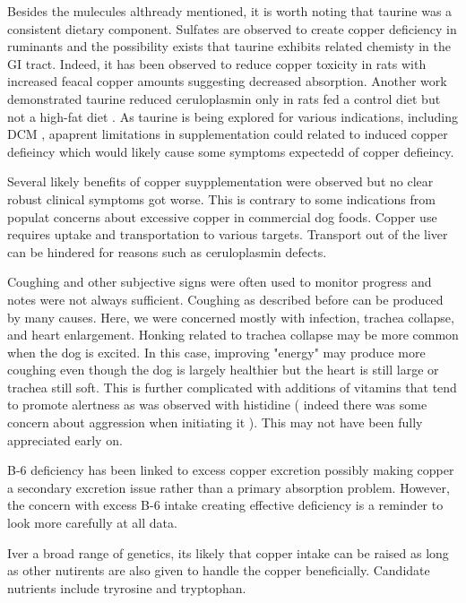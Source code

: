 Besides the mulecules althready mentioned, it is worth
noting that taurine was a consistent dietary component.
Sulfates are observed to create copper deficiency in ruminants
and the possibility exists that taurine exhibits related chemisty
in the GI tract. Indeed, it has been observed to reduce
copper toxicity in rats with increased feacal copper
amounts \cite{PMID9609396} suggesting decreased
absorption. 
Another work demonstrated taurine reduced ceruloplasmin only
in rats fed a  control diet but not a high-fat diet
\cite{Krol2020}.
As taurine is being explored for various indications,
including DCM \cite{PMC9257265},
apaprent limitations in supplementation could  related
to induced copper defieincy which would likely cause some
symptoms expectedd of copper defieincy.


Several likely benefits of copper suypplementation were observed
but no clear robust clinical symptoms got worse.
This is contrary to some indications from populat concerns
about excessive copper in commercial dog foods. 
Copper use requires uptake and transportation to 
various targets. Transport out of the liver can be hindered
for reasons such as ceruloplasmin defects.

Coughing and other subjective signs were often used
to monitor progress and notes were not always sufficient.
Coughing as described before can be produced by many
causes. Here, we were concerned mostly with infection,
trachea collapse, and heart enlargement. Honking
related to trachea collapse may be more common when the
dog is excited. In this case, improving "energy" may
produce more coughing even though the dog is largely
healthier but the heart is still large or trachea
still soft. This is further complicated with additions
of vitamins that tend to promote alertness as was 
observed with histidine ( indeed there was some concern
about aggression when initiating it ). This may not
have been fully appreciated early on.  


B-6 deficiency has been linked to excess copper excretion \cite{PMID7814236}
possibly making copper a secondary excretion issue
rather than a primary absorption problem. 
However, the concern with excess B-6 intake creating effective
deficiency is a reminder to look more carefully at all data. 


Iver a broad range of genetics, its likely that copper intake
can be raised as long as other nutirents are also given
to handle the copper beneficially.
Candidate nutrients include tryrosine and tryptophan.

